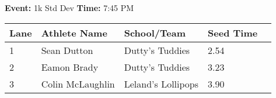 \documentclass[11pt]{article}
\begin{document}
\textbf{Event:} 1k Std Dev \quad \textbf{Time:} 7:45 PM 

\vspace{1em}
\begin{tabular}{@{}lllll@{}}
\toprule

\textbf{Lane} & \textbf{Athlete Name} & \textbf{School/Team} & \textbf{Seed Time} \\
\midrule
1 & Sean Dutton & Dutty's Tuddies & 2.54 &\\
2 & Eamon Brady & Dutty's Tuddies & 3.23 &\\
3 & Colin McLaughlin & Leland's Lollipops & 3.90 &\\
\bottomrule
\end{tabular}
\vspace{2.5em}
\end{document}
